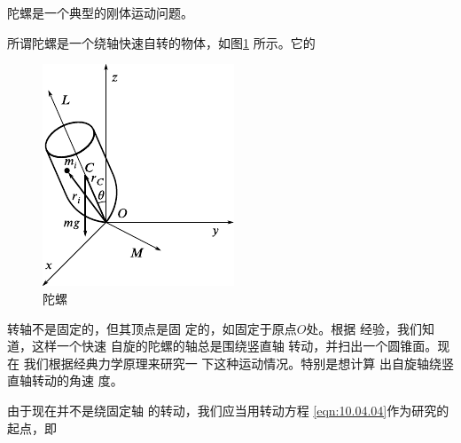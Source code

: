 \section[陀螺]{}\label{sec:10.05}

陀螺是一个典型的刚体运动问题。

所谓陀螺是一个绕轴快速自转的物体，如图\ref{fig:10.21} 所示。它的
\begin{figure}
    \centering
    \includegraphics{figure/fig10.21}
    \caption{陀螺}
    \label{fig:10.21}
\end{figure}
转轴不是固定的，但其顶点是固
定的，如固定于原点$ O $处。根据
经验，我们知道，这样一个快速
自旋的陀螺的轴总是围绕竖直轴
转动，并扫出一个圆锥面。现在
我们根据经典力学原理来研究一
下这种运动情况。特别是想计算
出自旋轴绕竖直轴转动的角速
度。

由于现在并不是绕固定轴
的转动，我们应当用转动方程
\eqref{eqn:10.04.04}作为研究的起点，即


